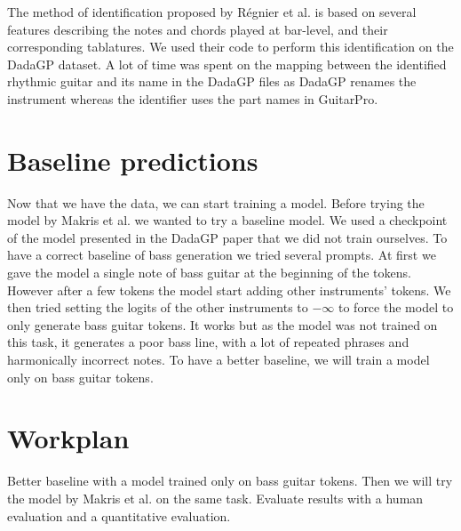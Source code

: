 \documentclass[11pt, a4paper]{article}
\begin{document}

The method of identification proposed by Régnier et al. \cite{regnier_identification_2021} is based on several features describing the notes and chords played at bar-level, and their corresponding tablatures.
We used their code to perform this identification on the DadaGP dataset.
A lot of time was spent on the mapping between the identified rhythmic guitar and its name in the DadaGP files as DadaGP renames the instrument whereas the identifier uses the part names in GuitarPro.

\section{Baseline predictions}
Now that we have the data, we can start training a model.
Before trying the model by Makris et al. we wanted to try a baseline model. We used a checkpoint of the model presented in the DadaGP paper \cite{sarmento_dadagp_2021} that we did not train ourselves.
To have a correct baseline of bass generation we tried several prompts. 
At first we gave the model a single note of bass guitar at the beginning of the tokens. 
However after a few tokens the model start adding other instruments' tokens.
We then tried setting the logits of the other instruments to $-\infty$ to force the model to only generate bass guitar tokens.
It works but as the model was not trained on this task, it generates a poor bass line, with a lot of repeated phrases and harmonically incorrect notes.
To have a better baseline, we will train a model only on bass guitar tokens.

\section{Workplan}

Better baseline with a model trained only on bass guitar tokens.
Then we will try the model by Makris et al. \cite{makris_guitarctrl_2021} on the same task.
Evaluate results with a human evaluation and a quantitative evaluation.


\newpage

\printbibliography%
\end{document}
